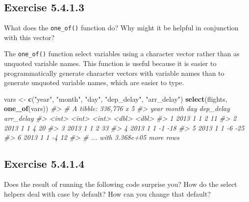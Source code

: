 \documentclass[]{book}
\newenvironment{Shaded}{\begin{snugshade}}{\end{snugshade}}
\newcommand{\CommentTok}[1]{\textcolor[rgb]{0.56,0.35,0.01}{\textit{#1}}}
\newcommand{\KeywordTok}[1]{\textcolor[rgb]{0.13,0.29,0.53}{\textbf{#1}}}
\newcommand{\NormalTok}[1]{#1}
\newcommand{\StringTok}[1]{\textcolor[rgb]{0.31,0.60,0.02}{#1}}
\theoremstyle{plain}
\theoremstyle{remark}
\begin{document}
\hypertarget{exercise-5.4.1.3}{%
\subsection*{\texorpdfstring{Exercise {5.4.1.3}}{Exercise 5.4.1.3}}\label{exercise-5.4.1.3}}

What does the \texttt{one\_of()} function do? Why might it be helpful in conjunction with this vector?

The \texttt{one\_of()} function select variables using a character vector rather than as unquoted variable names.
This function is useful because it is easier to programmatically generate character vectors with variable names than to generate unquoted variable names, which are easier to type.

\begin{Shaded}
\begin{Highlighting}[]
\NormalTok{vars <-}\StringTok{ }\KeywordTok{c}\NormalTok{(}\StringTok{"year"}\NormalTok{, }\StringTok{"month"}\NormalTok{, }\StringTok{"day"}\NormalTok{, }\StringTok{"dep_delay"}\NormalTok{, }\StringTok{"arr_delay"}\NormalTok{)}
\KeywordTok{select}\NormalTok{(flights, }\KeywordTok{one_of}\NormalTok{(vars))}
\CommentTok{#> # A tibble: 336,776 x 5}
\CommentTok{#>    year month   day dep_delay arr_delay}
\CommentTok{#>   <int> <int> <int>     <dbl>     <dbl>}
\CommentTok{#> 1  2013     1     1         2        11}
\CommentTok{#> 2  2013     1     1         4        20}
\CommentTok{#> 3  2013     1     1         2        33}
\CommentTok{#> 4  2013     1     1        -1       -18}
\CommentTok{#> 5  2013     1     1        -6       -25}
\CommentTok{#> 6  2013     1     1        -4        12}
\CommentTok{#> # ... with 3.368e+05 more rows}
\end{Highlighting}
\end{Shaded}

\hypertarget{exercise-5.4.1.4}{%
\subsection*{\texorpdfstring{Exercise {5.4.1.4}}{Exercise 5.4.1.4}}\label{exercise-5.4.1.4}}

Does the result of running the following code surprise you? How do the select helpers deal with case by default? How can you change that default?
\end{document}
